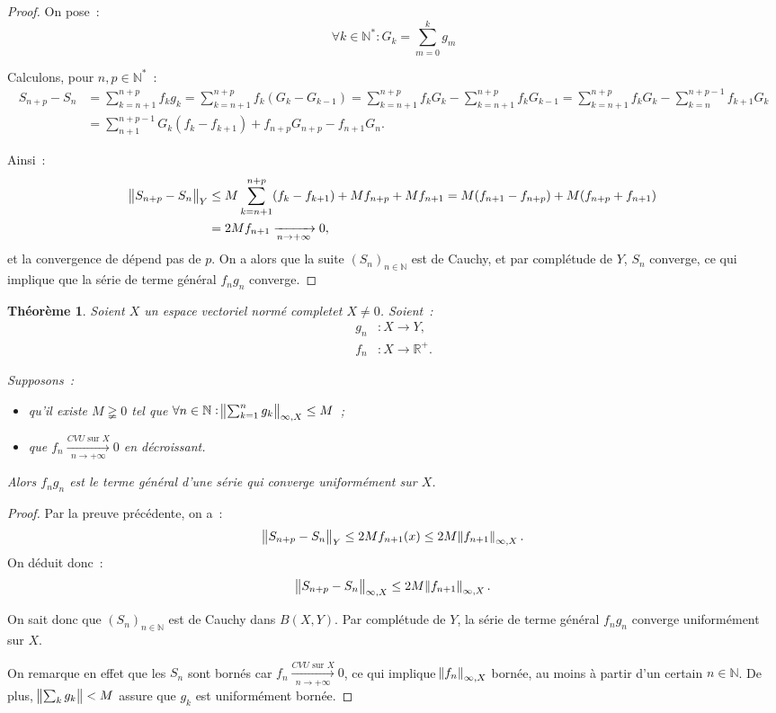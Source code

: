 \documentclass{report}
\newtheorem{thm}{Théorème}[chapter]
\theoremstyle{definition}
\theoremstyle{remark}
\newcommand{\R}{\mathbb R}
\newcommand{\Rp}{\R^{+}}
\newcommand{\N}{\mathbb N}
\newcommand{\Ns}{\N^{*}}
\newcommand{\seq}[3]{\left(#1_{#2}\right)_{#2 \in #3}}
\newcommand{\CONV}[5]{\xrightarrow[#2 \to #3]{#4 \text{ #5 } #1}}
\newcommand{\CVU}[3]{\CONV{#1}{#2}{#3}{CVU}{sur}}
\newcommand{\pinfty}{{+\infty}}
\newcommand{\evn}{espace vectoriel normé}
\newcommand{\evnc}{{\evn} complet}
\begin{document}
			\begin{proof} On pose~:
			\[\forall k \in \Ns : G_k = \sum_{m=0}^kg_m\]

			Calculons, pour $n, p \in \Ns$~:
			\begin{align*}
				S_{n+p} - S_n &= \sum_{k=n+1}^{n+p}f_kg_k = \sum_{k=n+1}^{n+p}f_k(G_k - G_{k-1}) = \sum_{k=n+1}^{n+p}f_kG_k - \sum_{k=n+1}^{n+p}f_kG_{k-1}
				= \sum_{k=n+1}^{n+p}f_kG_k - \sum_{k=n}^{n+p-1}f_{k+1}G_k \\
				&= \sum_{n+1}^{n+p-1}G_k(f_k - f_{k+1}) + f_{n+p}G_{n+p} - f_{n+1}G_n.
			\end{align*}

			Ainsi~:
			\begin{align*}
				\norm {S_{n+p} - S_n}_Y &\leq M\sum_{k=n+1}^{n+p}(f_k-f_{k+1}) + Mf_{n+p} + Mf_{n+1} = M(f_{n+1}-f_{n+p}) + M(f_{n+p} + f_{n+1}) \\
				&= 2Mf_{n+1} \xrightarrow [n \to \pinfty]{} 0,
			\end{align*}
			et la convergence de dépend pas de $p$. On a alors que la suite $\seq Sn\N$ est de Cauchy, et par complétude de $Y$, $S_n$ converge, ce qui implique que la
			série de terme général $f_ng_n$ converge.
			\end{proof}

			\begin{thm} Soient $X$ un \evnc et $X \neq 0$. Soient~:
			\begin{align*}
				g_n &: X \to Y, \\
				f_n &: X \to \Rp.
			\end{align*}

			Supposons~:
			\begin{itemize}
				\item qu'il existe $M \gneqq 0$ tel que $\forall n \in \N : \norm {\sum_{k=1}^ng_k}_{\infty, X} \leq M$~;
				\item que $f_n \CVU Xn\pinfty 0$ en décroissant.
			\end{itemize}

			Alors $f_ng_n$ est le terme général d'une série qui converge uniformément sur $X$.
			\end{thm}

			\begin{proof} Par la preuve précédente, on a~:
			\[\norm {S_{n+p} - S_n}_Y \leq 2Mf_{n+1}(x) \leq 2M\norm {f_{n+1}}_{\infty, X}.\]
			On déduit donc~:
			\[\norm {S_{n+p}-S_n}_{\infty, X} \leq 2M\norm {f_{n+1}}_{\infty, X}.\]

			On sait donc que $\seq Sn\N$ est de Cauchy dans $B(X, Y)$. Par complétude de $Y$, la série de terme général $f_ng_n$ converge uniformément sur $X$.

			On remarque en effet que les $S_n$ sont bornés car $f_n \CVU Xn\pinfty 0$, ce qui implique $\norm {f_n}_{\infty, X}$ bornée, au moins à partir d'un certain
			$n \in \N$. De plus, $\norm {\sum_kg_k} < M$ assure que $g_k$ est uniformément bornée.
			\end{proof}
\end{document}
